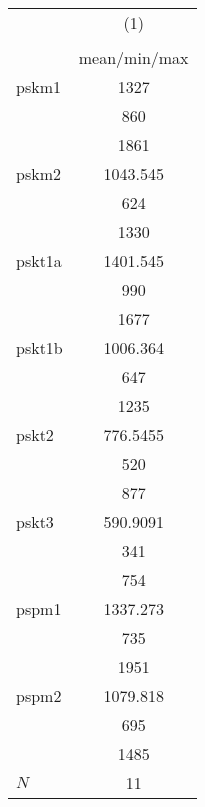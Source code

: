 {
\def\sym#1{\ifmmode^{#1}\else\(^{#1}\)\fi}
\begin{tabular}{l*{1}{c}}
\hline\hline
            &\multicolumn{1}{c}{(1)}\\
            &\multicolumn{1}{c}{}\\
            &mean/min/max\\
\hline
pskm1       &        1327\\
            &         860\\
            &        1861\\
pskm2       &    1043.545\\
            &         624\\
            &        1330\\
pskt1a      &    1401.545\\
            &         990\\
            &        1677\\
pskt1b      &    1006.364\\
            &         647\\
            &        1235\\
pskt2       &    776.5455\\
            &         520\\
            &         877\\
pskt3       &    590.9091\\
            &         341\\
            &         754\\
pspm1       &    1337.273\\
            &         735\\
            &        1951\\
pspm2       &    1079.818\\
            &         695\\
            &        1485\\
\hline
\(N\)       &          11\\
\hline\hline
\end{tabular}
}
